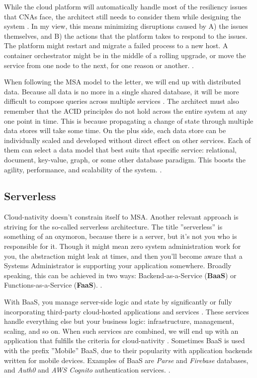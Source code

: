 \documentclass[utf8,english]{gradu3}
\begin{document}
While the cloud platform will automatically handle most of the resiliency issues
that CNAs face, the architect still needs to consider them while designing the
system \parencite{Microsoft2022-Resiliency}. In my view, this means minimizing
disruptions caused by A) the issues themselves, and B) the actions that the
platform takes to respond to the issues. The platform might restart and
migrate a failed process to a new host. A container orchestrator might
be in the middle of a rolling upgrade, or move the service from one node to
the next, for one reason or another. \parencite{Microsoft2022-Resiliency}.

When following the MSA model to the letter, we will end up with distributed
data. Because all data is no more in a single shared database, it will be more
difficult to compose queries across multiple services
\parencite{Microsoft2022-Data}. The architect must also remember that the ACID
principles do not hold across the entire system at any one point in time. This
is because propagating a change of state through multiple data stores will take
some time. On the plus side, each data store can be individually scaled and
developed without direct effect on other services. Each of them can select a
data model that best suits that specific service: relational, document,
key-value, graph, or some other database paradigm. This boosts the agility,
performance, and scalability of the system.  \parencite{Microsoft2022-Data}.


\subsection{Serverless}

Cloud-nativity doesn't constrain itself to MSA. Another relevant approach is
striving for the so-called serverless architecture. The title
''serverless'' is something of an oxymoron, because there is a server, but it's
not you who is responsible for it. Though it might mean zero system
administration work for you, the abstraction might leak at times, and then
you'll become aware that a Systems Administrator is supporting your application
somewhere. Broadly speaking, this can be achieved in two ways:
Backend-as-a-Service (\textbf{BaaS}) or Functions-as-a-Service (\textbf{FaaS}).
\parencite{Roberts2018}.

With BaaS, you manage server-side logic and state by significantly or fully
incorporating third-party cloud-hosted applications and services
\parencite{Roberts2018}.  These services handle everything else but your
business logic: infrastructure, management, scaling, and so on. When such
services are combined, we will end up with an application that fulfills the
criteria for cloud-nativity \parencite[20]{Gannon2017}. Sometimes BaaS is used
with the prefix ''Mobile'' BaaS, due to their popularity with application
backends written for mobile devices. Examples of BaaS are \textit{Parse} and
\textit{Firebase} databases, and \textit{Auth0} and \textit{AWS Cognito}
authentication services.  \parencite{Roberts2018}.
\end{document}
